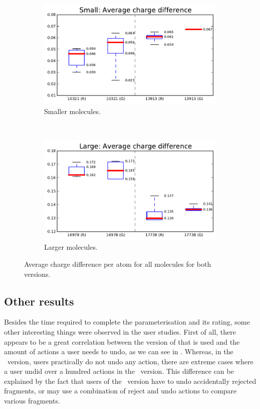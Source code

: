 \begin{figure}[h!]
\centering
\begin{subfigure}[t]{0.48\textwidth}
\centering
\includegraphics[width=\textwidth]{img/graphs/1c_01.pdf}
\caption{Smaller molecules.}
\end{subfigure}%
~
\begin{subfigure}[t]{0.48\textwidth}
\centering
\includegraphics[width=\textwidth]{img/graphs/1d_01.pdf}
\caption{Larger molecules.}
\end{subfigure}
\caption{Average charge difference per atom for all molecules for both versions.}
\end{figure}


\subsection{Other results}

Besides the time required to complete the parameterisation and its rating, some other interesting things were observed in the user studies. First of all, there appears to be a great correlation between the version of \oframp{} that is used and the amount of actions a user needs to undo, as we can see in . Whereas, in the \IDa\ version, users practically do not undo any action, there are extreme cases where a user undid over a hundred actions in the \IDb\ version. This difference can be explained by the fact that users of the \IDb\ version have to undo accidentally rejected fragments, or may use a combination of reject and undo actions to compare various fragments.

